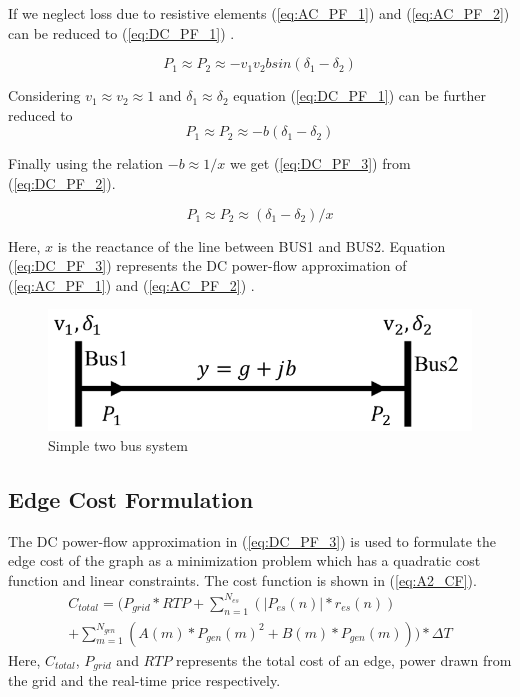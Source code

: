 If we neglect loss due to resistive elements (\ref{eq:AC_PF_1}) and (\ref{eq:AC_PF_2}) can be reduced to (\ref{eq:DC_PF_1}) \cite{DC_PF1}.

\begin{equation}
\label{eq:DC_PF_1}
P_1 \approx P_2 \approx - v_1v_2bsin(\delta_1 - \delta_2)
\end{equation}

Considering $v_1 \approx v_2 \approx 1$ and $\delta_1 \approx \delta_2$ equation (\ref{eq:DC_PF_1}) can be further reduced to
\begin{equation}
\label{eq:DC_PF_2}
P_1 \approx P_2 \approx -b(\delta_1 - \delta_2)
\end{equation}

Finally using the relation $-b \approx 1/x$ we get (\ref{eq:DC_PF_3}) from   (\ref{eq:DC_PF_2}).

\begin{equation}
\label{eq:DC_PF_3}
P_1 \approx P_2 \approx (\delta_1 - \delta_2)/x
\end{equation}

Here, $x$ is the reactance of the line between BUS1 and BUS2. Equation (\ref{eq:DC_PF_3}) represents the DC power-flow approximation of (\ref{eq:AC_PF_1}) and (\ref{eq:AC_PF_2}) \cite{DC_PF1}.

\begin{figure}[!ht]
\centering
\includegraphics[width = 0.6\linewidth]{figs/A82/DC_PF.png}
\caption{Simple two bus system}
\label{fig:DC_PF}
\end{figure}

\subsection{Edge Cost Formulation}
The DC power-flow approximation in (\ref{eq:DC_PF_3}) is used to formulate the edge cost of the graph as a minimization problem which has a quadratic cost function and linear constraints. The cost function is shown in (\ref{eq:A2_CF}).
\begin{multline}
\label{eq:A2_CF}
C_{total} = (P_{grid} * RTP + \sum_{n=1}^{N_{es}} (|P_{es}(n)|*r_{es}(n)) \\+
\sum_{m=1}^{N_{gen}}(A(m)*P_{gen}(m)^2 + B(m)*P_{gen}(m)))*\Delta T
\end{multline}
Here, $C_{total}$, $P_{grid}$ and $RTP$ represents the total cost of an edge, power drawn from the grid and the real-time price respectively.

